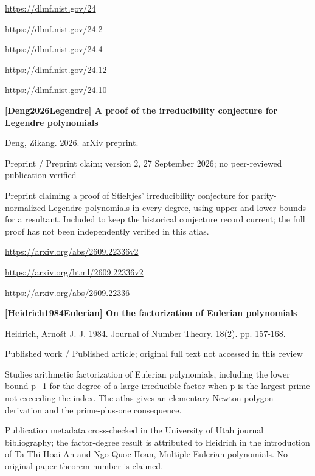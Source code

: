 \documentclass[11pt,a4paper,oneside,openany]{book}
\begin{document}
{\footnotesize\url{https://dlmf.nist.gov/24}}\par
{\footnotesize\url{https://dlmf.nist.gov/24.2}}\par
{\footnotesize\url{https://dlmf.nist.gov/24.4}}\par
{\footnotesize\url{https://dlmf.nist.gov/24.12}}\par
{\footnotesize\url{https://dlmf.nist.gov/24.10}}\par
\vspace{9pt}
\hypertarget{ref:Deng2026Legendre}{}
{\sffamily\bfseries\color{atlasgreen}[Deng2026Legendre] A proof of the irreducibility conjecture for Legendre polynomials}\par
\color{black} Deng, Zikang. 2026. arXiv preprint.\par
{\small\sffamily\color{atlasgold}Preprint / Preprint claim; version 2, 27 September 2026; no peer-reviewed publication verified}\par
\color{black} Preprint claiming a proof of Stieltjes' irreducibility conjecture for parity-normalized Legendre polynomials in every degree, using upper and lower bounds for a resultant. Included to keep the historical conjecture record current; the full proof has not been independently verified in this atlas.\par
{\footnotesize\url{https://arxiv.org/abs/2609.22336v2}}\par
{\footnotesize\url{https://arxiv.org/html/2609.22336v2}}\par
{\footnotesize\url{https://arxiv.org/abs/2609.22336}}\par
\vspace{9pt}
\hypertarget{ref:Heidrich1984Eulerian}{}
{\sffamily\bfseries\color{atlasgreen}[Heidrich1984Eulerian] On the factorization of Eulerian polynomials}\par
\color{black} Heidrich, Arnošt J. J. 1984. Journal of Number Theory. 18(2). pp. 157-168.\par
{\small\sffamily\color{atlasgold}Published work / Published article; original full text not accessed in this review}\par
\color{black} Studies arithmetic factorization of Eulerian polynomials, including the lower bound p\ensuremath{-}1 for the degree of a large irreducible factor when p is the largest prime not exceeding the index. The atlas gives an elementary Newton-polygon derivation and the prime-plus-one consequence.\par
{\small Publication metadata cross-checked in the University of Utah journal bibliography; the factor-degree result is attributed to Heidrich in the introduction of Ta Thi Hoai An and Ngo Quoc Hoan, Multiple Eulerian polynomials. No original-paper theorem number is claimed.}\par
\end{document}
